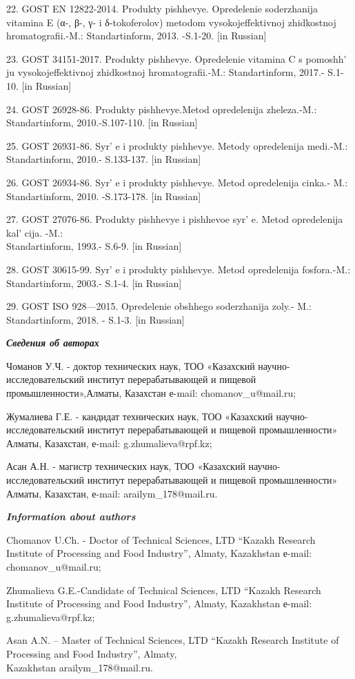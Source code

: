 \begin{references}
22. GOST EN 12822-2014. Produkty pishhevye. Opredelenie soderzhanija
vitamina E (α-, β-, γ- i δ-tokoferolov) metodom vysokojeffektivnoj
zhidkostnoj hromatografii.-M.: Standartinform, 2013. -S.1-20. {[}in
Russian{]}

23. GOST 34151-2017. Produkty pishhevye. Opredelenie vitamina C s
pomoshh' ju vysokojeffektivnoj zhidkostnoj
hromatografii.-M.: Standartinform, 2017.- S.1-10. {[}in Russian{]}

24. GOST 26928-86. Produkty pishhevye.Metod opredelenija zheleza.-M.:
Standartinform, 2010.-S.107-110. {[}in Russian{]}

25. GOST 26931-86. Syr' e i produkty pishhevye. Metody
opredelenija medi.-M.: Standartinform, 2010.- S.133-137. {[}in
Russian{]}

26. GOST 26934-86. Syr' e i produkty pishhevye. Metod
opredelenija cinka.- M.: Standartinform, 2010. -S.173-178. {[}in
Russian{]}

27. GOST 27076-86. Produkty pishhevye i pishhevoe syr' e.
Metod opredelenija kal' cija. -M.: \\Standartinform, 1993.-
S.6-9. {[}in Russian{]}

28. GOST 30615-99. Syr' e i produkty pishhevye. Metod
opredelenija fosfora.-M.: Standartinform, 2003.- S.1-4. {[}in
Russian{]}

29. GOST ISO 928---2015. Opredelenie obshhego soderzhanija zoly.- M.:
Standartinform, 2018. - S.1-3. {[}in Russian{]}
\end{references}

\begin{authorinfo}
\emph{{\bfseries Сведения об авторах}}

Чоманов У.Ч. - доктор технических наук, ТОО «Казахский
научно-исследовательский институт перерабатывающей и пищевой
промышленности»,Алматы, Казахстан е-mail:
chomanov\_u@mail.ru;

Жумалиева Г.Е. - кандидат технических наук, ТОО «Казахский
научно-исследовательский институт перерабатывающей и пищевой
промышленности» Алматы, Казахстан, е-mail:
g.zhumalieva@rpf.kz;

Асан А.Н. - магистр технических наук, ТОО «Казахский
научно-исследовательский институт перерабатывающей и пищевой
промышленности» Алматы, Казахстан, е-mail:
arailym\_178@mail.ru.

\emph{{\bfseries Information about authors}}

Chomanov U.Ch. - Doctor of Technical Sciences, LTD ``Kazakh Research
Institute of Processing and Food Industry'', Almaty, Kazakhstan е-mail:
chomanov\_u@mail.ru;

Zhumalieva G.E.-Candidate of Technical Sciences, LTD ``Kazakh Research
Institute of Processing and Food Industry'', Almaty, Kazakhstan е-mail:
g.zhumalieva@rpf.kz;

Asan A.N. -- Master of Technical Sciences, LTD ``Kazakh Research
Institute of Processing and Food Industry'', Almaty, \\Kazakhstan
arailym\_178@mail.ru.
\end{authorinfo}
